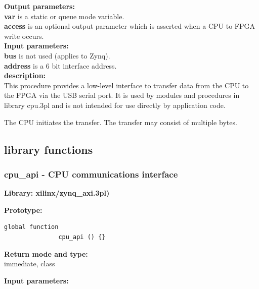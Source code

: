             {\bf Output parameters:} \\
            {\bf var} is a static or queue mode variable.\\          
            {\bf access} is an optional output parameter which is asserted
            when a CPU to FPGA write occurs.\\
                       
            {\bf Input parameters:} \\
            {\bf bus} is not used (applies to Zynq).\\
            {\bf address} is a 6 bit interface address.\\           
                     
            {\bf description:} \\
            This procedure provides a low-level interface to transfer
            data from the CPU to the FPGA via the USB serial port. It is
            used by modules and procedures in library cpu.3pl and is not
            intended for use directly by application code.
            
            The CPU initiates the transfer. The transfer may consist of
            multiple bytes.





    \subsection{library functions}
            

        \subsubsection{cpu\_api - CPU communications interface}\label{sec:lfcpuapi}

            {\bf Library: xilinx/zynq\_axi.3pl)}

            {\bf Prototype:} \\
            \vsp
            \begin{lstlisting}[gobble=12, language=threepl]
               global function
               cpu_api () {}
            \end{lstlisting}

            {\bf Return mode and type:} \\
            immediate, class

            {\bf Input parameters:} \\            
            
